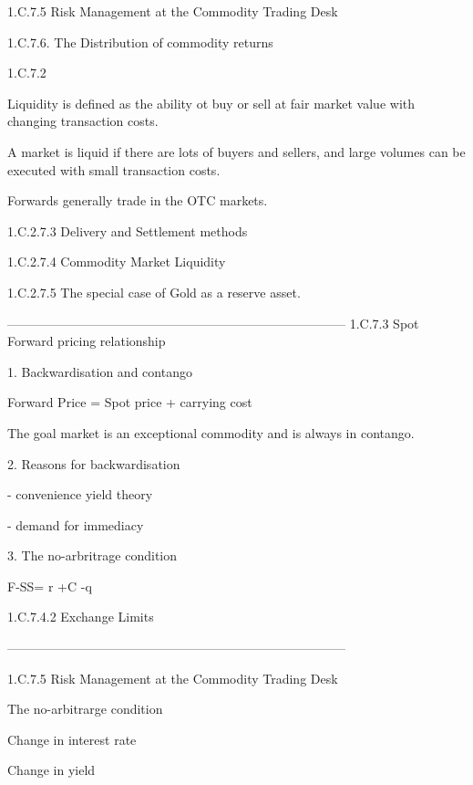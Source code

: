 1.C.7.5 Risk Management at the Commodity Trading Desk

1.C.7.6. The Distribution of commodity returns


1.C.7.2

Liquidity is defined as the ability ot buy or sell at fair market value with changing transaction costs.

A market is liquid if there are lots of buyers and sellers, and large volumes can be executed with small transaction costs.

 

Forwards generally trade in the OTC markets.

 

1.C.2.7.3 Delivery and Settlement methods

1.C.2.7.4 Commodity Market Liquidity

1.C.2.7.5 The special case of Gold as a reserve asset.

 


--------------------------------------------------------------------------------
1.C.7.3 Spot Forward pricing relationship

 

1. Backwardisation and contango

 

Forward Price = Spot price + carrying cost

 

The goal market is an exceptional commodity and is always in contango.

 

2. Reasons for backwardisation

 

 - convenience yield theory

 - demand for immediacy

 

3. The no-arbritrage condition

 

F-SS= r +C -q

 

1.C.7.4.2 Exchange Limits

 


--------------------------------------------------------------------------------


1.C.7.5 Risk Management at the Commodity Trading Desk

The no-arbitrarge condition

Change in interest rate

Change in yield


